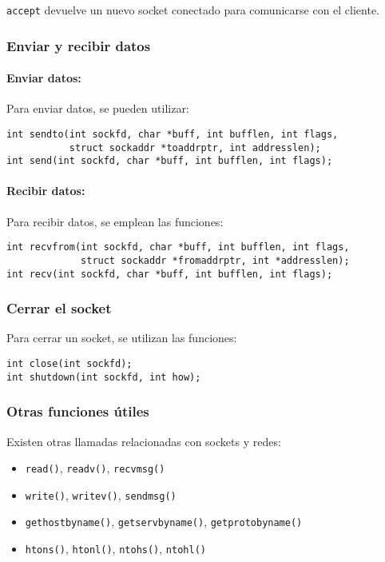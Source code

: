 \documentclass[a4paper,12pt]{article}
\begin{document}
\texttt{accept} devuelve un nuevo socket conectado para comunicarse con el cliente.

\subsubsection{Enviar y recibir datos}

\paragraph{Enviar datos:} Para enviar datos, se pueden utilizar:

\begin{verbatim}
int sendto(int sockfd, char *buff, int bufflen, int flags,
           struct sockaddr *toaddrptr, int addresslen);
int send(int sockfd, char *buff, int bufflen, int flags);
\end{verbatim}

\paragraph{Recibir datos:} Para recibir datos, se emplean las funciones:

\begin{verbatim}
int recvfrom(int sockfd, char *buff, int bufflen, int flags,
             struct sockaddr *fromaddrptr, int *addresslen);
int recv(int sockfd, char *buff, int bufflen, int flags);
\end{verbatim}

\subsubsection{Cerrar el socket}

Para cerrar un socket, se utilizan las funciones:

\begin{verbatim}
int close(int sockfd);
int shutdown(int sockfd, int how);
\end{verbatim}

\subsubsection{Otras funciones útiles}

Existen otras llamadas relacionadas con sockets y redes:

\begin{itemize}
    \item \texttt{read()}, \texttt{readv()}, \texttt{recvmsg()}
    \item \texttt{write()}, \texttt{writev()}, \texttt{sendmsg()}
    \item \texttt{gethostbyname()}, \texttt{getservbyname()}, \texttt{getprotobyname()}
    \item \texttt{htons()}, \texttt{htonl()}, \texttt{ntohs()}, \texttt{ntohl()}
\end{itemize}
\end{document}
